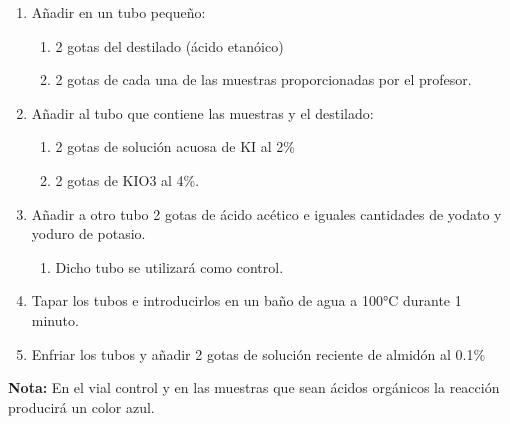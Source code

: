 \begin{enumerate}
    \item Añadir en un tubo pequeño:
    \begin{enumerate}
        \item 2 gotas del destilado (ácido etanóico)
        \item 2 gotas de cada una de las muestras proporcionadas por el profesor.
    \end{enumerate}
    
    \item Añadir al tubo que contiene las muestras y el destilado:
    \begin{enumerate}
        \item 2 gotas de solución acuosa de KI al 2\%
        \item 2 gotas de KIO3 al 4\%.
    \end{enumerate}

    \item Añadir a otro tubo 2 gotas de ácido acético e iguales cantidades de yodato y yoduro de potasio.
    \begin{enumerate}
        \item Dicho tubo se utilizará como control.
    \end{enumerate}

    \item Tapar los tubos e introducirlos en un baño de agua a 100°C durante 1 minuto.
    \item Enfriar los tubos y añadir 2 gotas de solución reciente de almidón al 0.1\%
\end{enumerate}

\textbf{Nota:} En el vial control y en las muestras que sean ácidos orgánicos la reacción producirá un color azul.